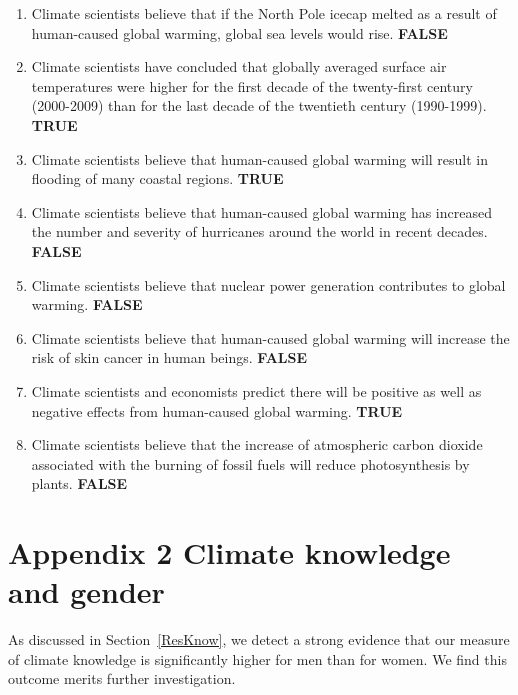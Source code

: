 \documentclass[a4paper,12pt]{article}
\begin{document}
\begin{enumerate}

\item Climate scientists believe that if the North Pole icecap melted as a result of human-caused global warming, global sea levels would rise.  \textbf{FALSE}

\item Climate scientists have concluded
that globally averaged surface air
temperatures were higher for the 
first decade of the twenty-first
century (2000-2009) than for the last decade of the twentieth
century (1990-1999).   \textbf{TRUE}

\item Climate scientists believe that
human-caused global warming
will result in flooding of many
coastal regions. \textbf{TRUE}

\item Climate scientists believe that
human-caused global warming
has increased the number and
severity of hurricanes around the
world in recent decades. \textbf{FALSE}


\item Climate scientists believe that
nuclear power generation
contributes to global warming.  \textbf{FALSE}


\item Climate scientists believe that
human-caused global warming
will increase the risk of skin cancer in human beings.  \textbf{FALSE}

\item Climate scientists and economists
predict there will be positive as
well as negative effects from
human-caused global warming. \textbf{TRUE}


\item Climate scientists believe that the
increase of atmospheric carbon
dioxide associated with the
burning of fossil fuels will reduce
photosynthesis by plants.  \textbf{FALSE}

\end{enumerate}



\section{Appendix 2 Climate knowledge and gender}



As discussed in Section~\ref{ResKnow}, we detect a strong evidence that our measure of climate knowledge is significantly higher for men than for women. We find this outcome merits further investigation. 
\end{document}
